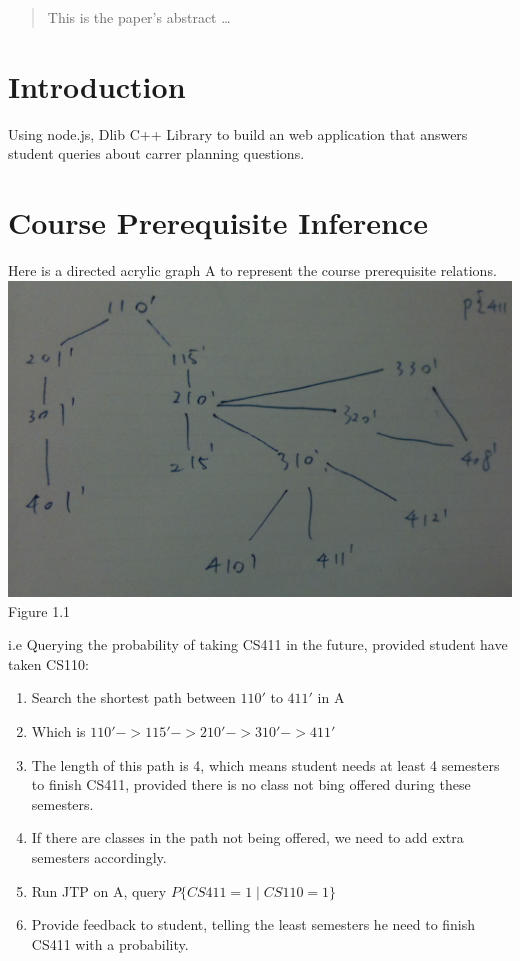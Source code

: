 \documentclass[12pt]{article}
\begin{document}
\maketitle

\begin{abstract}
This is the paper's abstract \ldots
\end{abstract}


\section{Introduction}
Using node.js, Dlib C++ Library to build an web application that answers student queries about carrer planning questions.

\section{Course Prerequisite Inference}\label{Course Prerequisite Inference}
Here is a directed acrylic graph A to represent the course prerequisite relations.\\
\includegraphics[scale=0.3]{g1_1.jpg}\\
Figure 1.1

i.e Querying the probability of taking CS411 in the future, provided student have taken CS110:\\
\begin{enumerate}
	\item Search the shortest path between $110'$ to $411'$ in A
	\item Which is $110' -> 115' -> 210' -> 310' -> 411'$
	\item The length of this path is 4, which means student needs at least 4 semesters to finish CS411, provided there is no class not bing offered during these semesters.
	\item If there are classes in the path not being offered, we need to add extra semesters accordingly.
	\item Run JTP on A, query $P\{CS411 = 1 \mid CS110 = 1\}$
	\item Provide feedback to student, telling the least semesters he need to finish CS411 with a probability.
\end{enumerate}
\end{document}
